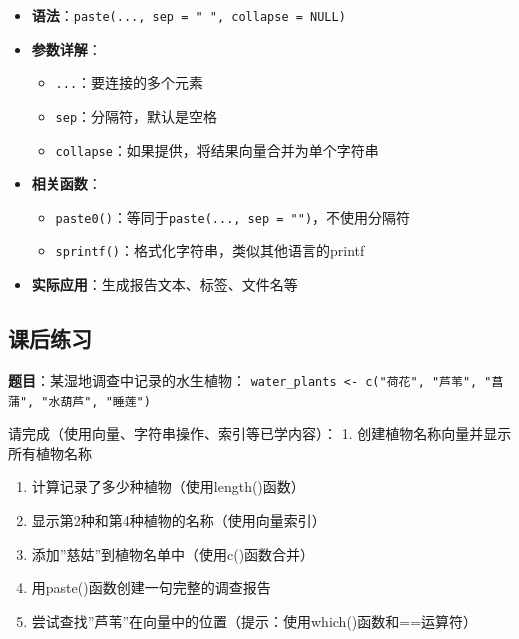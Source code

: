 \documentclass[
  twoside]{book}
\providecommand{\tightlist}{%
  \setlength{\itemsep}{0pt}\setlength{\parskip}{0pt}}
\begin{document}
\begin{itemize}
\tightlist
\item
  \textbf{语法}：\texttt{paste(...,\ sep\ =\ "\ ",\ collapse\ =\ NULL)}
\item
  \textbf{参数详解}：

  \begin{itemize}
  \tightlist
  \item
    \texttt{...}：要连接的多个元素
  \item
    \texttt{sep}：分隔符，默认是空格
  \item
    \texttt{collapse}：如果提供，将结果向量合并为单个字符串
  \end{itemize}
\item
  \textbf{相关函数}：

  \begin{itemize}
  \tightlist
  \item
    \texttt{paste0()}：等同于\texttt{paste(...,\ sep\ =\ "")}，不使用分隔符
  \item
    \texttt{sprintf()}：格式化字符串，类似其他语言的printf
  \end{itemize}
\item
  \textbf{实际应用}：生成报告文本、标签、文件名等
\end{itemize}

\hypertarget{ux8bfeux540eux7ec3ux4e60-1}{%
\subsection{课后练习}\label{ux8bfeux540eux7ec3ux4e60-1}}

\textbf{题目}：某湿地调查中记录的水生植物：
\texttt{water\_plants\ \textless{}-\ c("荷花",\ "芦苇",\ "菖蒲",\ "水葫芦",\ "睡莲")}

请完成（使用向量、字符串操作、索引等已学内容）：
1. 创建植物名称向量并显示所有植物名称

\begin{enumerate}
\def\labelenumi{\arabic{enumi}.}
\setcounter{enumi}{1}
\item
  计算记录了多少种植物（使用length()函数）
\item
  显示第2种和第4种植物的名称（使用向量索引）
\item
  添加''慈姑''到植物名单中（使用c()函数合并）
\item
  用paste()函数创建一句完整的调查报告
\item
  尝试查找''芦苇''在向量中的位置（提示：使用which()函数和==运算符）
\end{enumerate}
\end{document}

